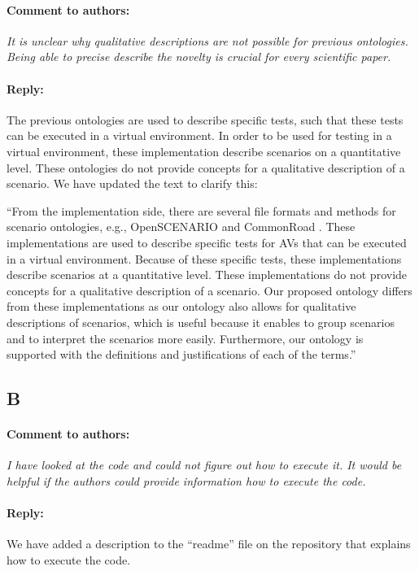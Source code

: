\documentclass[10pt,final,a4paper,oneside,onecolumn]{article}
\newcommand{\toauthor}{\paragraph*{Comment to authors:} \itshape}
\newcommand{\fromauthor}{\paragraph*{Reply:} \normalfont}
\newcommand{\toauthornew}{\paragraph*{Comment to authors:} \itshape}
\newcommand{\fromauthornew}{\paragraph*{Reply:} \normalfont}
\newcommand{\cstart}{\cbstart\color{red}}
\newcommand{\cend}{\cbend\color{black}}
\begin{document}
\toauthornew It is unclear why qualitative descriptions are not possible for previous ontologies. Being able to precise describe the novelty is crucial for every scientific paper. 

\fromauthornew The previous ontologies are used to describe specific tests, such that these tests can be executed in a virtual environment. In order to be used for testing in a virtual environment, these implementation describe scenarios on a quantitative level. These ontologies do not provide concepts for a qualitative description of a scenario. We have updated the text to clarify this:

``From the implementation side, there are several file formats and methods for scenario ontologies, e.g., OpenSCENARIO \autocite{openscenario} and CommonRoad \autocite{althoff2017CommonRoad}. 
\cstart These implementations are used to describe specific tests for AVs that can be executed in a virtual environment.
Because of these specific tests, these implementations describe scenarios at a quantitative level.
These implementations do not provide concepts for a qualitative description of a scenario. \cend
Our proposed ontology differs from these implementations as our ontology also allows for qualitative descriptions of scenarios, which is useful because it enables to group scenarios and to interpret the scenarios more easily.
Furthermore, our ontology is supported with the definitions and justifications of each of the terms.''



\subsection*{B}

%

\toauthornew I have looked at the code and could not figure out how to execute it. It would be helpful if the authors could provide information how to execute the code.

\fromauthornew We have added a description to the ``readme'' file on the repository that explains how to execute the code.
\end{document}
